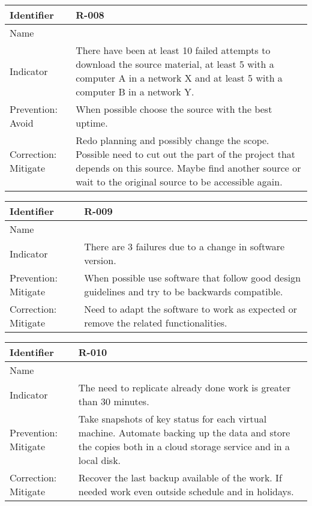 \begin{table}[H]
	\begin{tabularx}{\textwidth}{|y|z|}
		\hline
		Identifier & \textbf{R-008} \\ \hline
		Name & \Rocho \\ \hline
		Indicator & There have been at least 10 failed attempts to download the source material, at least 5 with a computer A in a network X and at least 5 with a computer B in a network Y.\\ \hline
		Prevention: Avoid & When possible choose the source with the best uptime.\\ \hline
		Correction: Mitigate
			& Redo planning and possibly change the scope. \linej
			 Possible need to cut out the part of the project that depends on this source. \linej
			 Maybe find another source or wait to the original source to be accessible again.\\ \hline
	\end{tabularx}
\end{table}

\begin{table}[H]
	\begin{tabularx}{\textwidth}{|y|z|}
		\hline
		Identifier & \textbf{R-009} \\ \hline
		Name & \Rnueve \\ \hline
		Indicator & There are 3 failures due to a change in software version.\\ \hline
		Prevention: Mitigate
			& When possible use software that follow good design guidelines and try to be backwards compatible.\\ \hline
		Correction: Mitigate
			& Need to adapt the software to work as expected or remove the related functionalities. \\ \hline
	\end{tabularx}
\end{table}

\begin{table}[H]
	\begin{tabularx}{\textwidth}{|y|z|}
		\hline
		Identifier & \textbf{R-010} \\ \hline
		Name & \Rdiez \\ \hline
		Indicator & The need to replicate already done work is greater than 30 minutes.\\ \hline
		Prevention: Mitigate
			& Take snapshots of key status for each virtual machine. \linej
			 Automate backing up the data and store the copies both in a cloud storage service and in a local disk.\\ \hline
		Correction: Mitigate
			& Recover the last backup available of the work. \linej
			 If needed work even outside schedule and in holidays. \\ \hline
	\end{tabularx}
\end{table}

